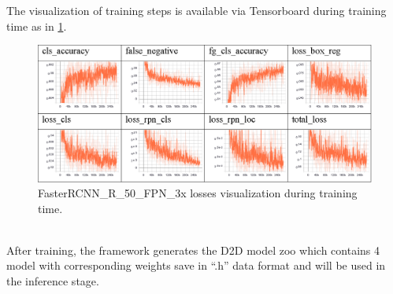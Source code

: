 The visualization of training steps is available via Tensorboard during training time as in \ref{fig:tensorboard}.
\begin{figure}
	\centerline{\includegraphics[width=1\linewidth]{Figs/tensorboard.png}}
	\caption{FasterRCNN\_R\_50\_FPN\_3x losses visualization during training time.}
	\label{fig:tensorboard}
\end{figure}
\\After training, the framework generates the D2D model zoo which contains 4 model with corresponding weights save in “.h” data format and will be used in the inference stage.
